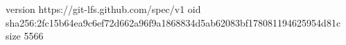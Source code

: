 version https://git-lfs.github.com/spec/v1
oid sha256:2fc15b64ea9c6ef72d662a96f9a1868834d5ab62083bf178081194625954d81c
size 5566
